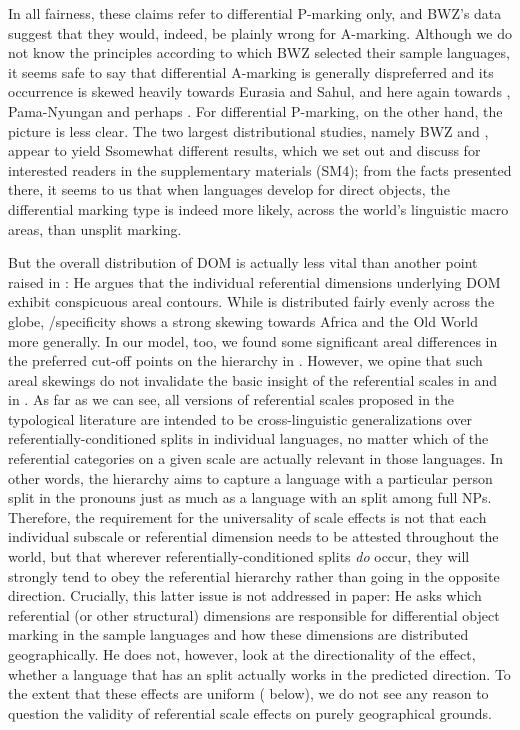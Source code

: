 \documentclass[output=paper]{langscibook}
\begin{document}
In all fairness, these claims refer to differential P-marking only, and BWZ’s data suggest that they would, indeed, be plainly wrong for A-marking. Although we do not know the principles according to which BWZ selected their sample languages, it seems safe to say that differential A-marking is generally dispreferred and its occurrence is skewed heavily towards Eurasia and Sahul, and here again towards , Pama-Nyun\-gan and perhaps . For differential P-marking, on the other hand, the picture is less clear. The two largest distributional studies, namely BWZ and \citet{Sinnemki2014Typological}, appear to yield Ssomewhat different results, which we set out and discuss for interested readers in the supplementary materials (SM4); from the facts presented there, it seems to us that when languages develop  for direct objects, the differential marking type is indeed more likely, across the world’s linguistic macro areas, than unsplit marking. 

But the overall distribution of DOM is actually less vital than another point raised in \citet{Sinnemki2014Typological}: 
He argues that the individual referential dimensions underlying DOM exhibit conspicuous areal contours. While  is distributed fairly evenly across the globe, /specificity shows a strong skewing towards Africa and the Old World more generally. In our model, too, we found some significant areal differences in the preferred cut-off points on the hierarchy in . However, we opine that such areal skewings do not invalidate the basic insight of the referential scales in  and in . As far as we can see, all versions of referential scales proposed in the typological literature are intended to be cross-linguistic generalizations over referentially-conditioned splits in individual languages, no matter which of the referential categories on a given scale are actually relevant in those languages. In other words, the hierarchy aims to capture a language with a particular person split in the pronouns just as much as a language with an  split among full NPs. Therefore, the requirement for the universality of scale effects is not that each individual subscale or referential dimension needs to be attested throughout the world, but that wherever referentially-conditioned splits \textit{do} occur, they will strongly tend to obey the referential hierarchy rather than going in the opposite direction. Crucially, this latter issue is not addressed in  paper: He asks which referential (or other structural) dimensions are responsible for differential object marking in the sample languages and how these dimensions are distributed geographically. 
He does not, however, look at the directionality of the effect, \ie whether a language that has an  split actually works in the predicted direction. To the extent that these effects are uniform (\cf {} below), we do not see any reason to question the validity of referential scale effects on purely geographical grounds.
\end{document}

